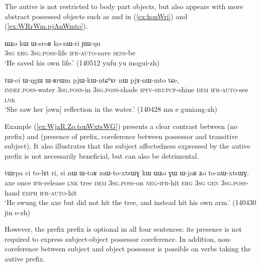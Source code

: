 The autive is not restricted to body part objects, but also appears with more abstract possessed objects such as  and  in (\ref{ex:konWri}) and (\ref{ex:WRrWm.pjAnWmto}).

\begin{exe}
\ex \label{ex:konWri}
\gll ɯʑo kɯ ɯ-sroʁ ko-nɯ-ri ɲɯ-ŋu \\
\textsc{3sg} \textsc{erg} \textsc{3sg}.\textsc{poss}-life \textsc{ifr}-\textsc{auto}-save \textsc{sens}-be \\
\glt `He saved his own life.' (140512 yufu yu mogui-zh)
\end{exe}

\begin{exe}
\ex \label{ex:WRrWm.pjAnWmto}
\gll tɯ-ci ɯ-ŋgɯ ɯ-ʁrɯm pjɯ-kɯ-ntɕʰɤr nɯ pjɤ-nɯ-mto tɕe,  \\
\textsc{indef}.\textsc{poss}-water \textsc{3sg}.\textsc{poss}-in \textsc{3sg}.\textsc{poss}-shade \textsc{ipfv}-\textsc{sbj}:\textsc{pcp}-shine \textsc{dem} \textsc{ifr}-\textsc{auto}-see \textsc{lnk} \\
\glt `She saw her [own] reflection in the water.' (140428 mu e guniang-zh)
\end{exe}

Example (\ref{ex:WjaR.Zo.tonWxtsWG}) presents a clear contrast between  (no  prefix) and  (presence of  prefix, coreference between possessor and transitive subject). It also illustrates that the subject affectedness expressed by the autive prefix is not necessarily beneficial, but can also be detrimental. 

\begin{exe}
\ex \label{ex:WjaR.Zo.tonWxtsWG}
\gll tɯrpa ci to-lɤt ri, si nɯ ɯ-taʁ mɯ-to-xtsɯɣ kɯ ɯʑo ɣɯ ɯ-jaʁ ʑo to-nɯ-xtsɯɣ. \\
axe once \textsc{ifr}-release \textsc{lnk} tree \textsc{dem} \textsc{3sg}.\textsc{poss}-on \textsc{neg}-\textsc{ifr}-hit \textsc{erg} \textsc{3sg} \textsc{gen} \textsc{3sg}.\textsc{poss}-hand \textsc{emph} \textsc{ifr}-\textsc{auto}-hit \\
\glt `He swung the axe but did not hit the tree, and instead hit his own arm.' (140430 jin e-zh)
\end{exe}

However, the   prefix prefix is optional in all four sentences: its presence is not required to express subject-object possessor coreference. In addition, non-coreference between subject and object possessor is possible on verbs  taking the autive prefix.

